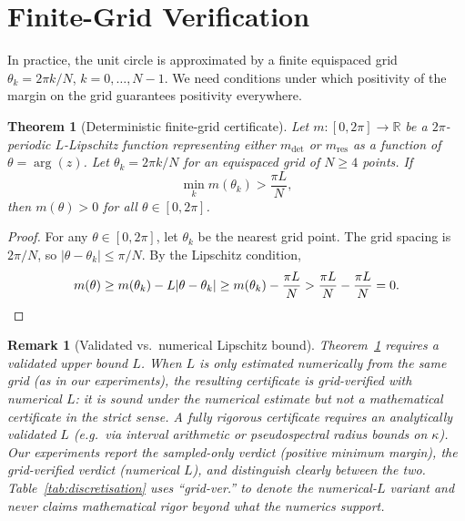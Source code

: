 \documentclass{article}
\newtheorem{theorem}{Theorem}
\newtheorem{remark}{Remark}
\theoremstyle{definition}
\newcommand{\R}{\mathbb{R}}
\begin{document}
\section{Finite-Grid Verification}
\label{sec:grid}

In practice, the unit circle is approximated by a finite equispaced grid
$\theta_k = 2\pi k / N$, $k = 0, \ldots, N-1$.  We need conditions under
which positivity of the margin on the grid guarantees positivity everywhere.

\begin{theorem}[Deterministic finite-grid certificate]
\label{thm:grid}
Let $m : [0, 2\pi] \to \R$ be a $2\pi$-periodic $L$-Lipschitz function
representing either $m_{\det}$ or $m_{\mathrm{res}}$ as a function of
$\theta = \arg(z)$.  Let $\theta_k = 2\pi k/N$ for an equispaced grid of
$N \geq 4$ points.  If
\[
  \min_{k} m(\theta_k) > \frac{\pi L}{N},
\]
then $m(\theta) > 0$ for all $\theta \in [0, 2\pi]$.
\end{theorem}

\begin{proof}
For any $\theta \in [0, 2\pi]$, let $\theta_k$ be the nearest grid point.
The grid spacing is $2\pi/N$, so $|\theta - \theta_k| \leq \pi/N$.  By the
Lipschitz condition,
\[
  m(\theta) \geq m(\theta_k) - L|\theta - \theta_k| \geq m(\theta_k) - \frac{\pi L}{N}
  > \frac{\pi L}{N} - \frac{\pi L}{N} = 0. \qedhere
\]
\end{proof}

\begin{remark}[Validated vs.\ numerical Lipschitz bound]
Theorem~\ref{thm:grid} requires a \emph{validated} upper bound $L$.  When
$L$ is only estimated numerically from the same grid (as in our experiments),
the resulting certificate is \emph{grid-verified with numerical $L$}: it is
sound under the numerical estimate but not a mathematical certificate in the
strict sense.  A fully rigorous certificate requires an analytically validated
$L$ (e.g.\ via interval arithmetic or pseudospectral radius bounds on
$\kappa$).  Our experiments report the sampled-only verdict (positive minimum
margin), the grid-verified verdict (numerical $L$), and distinguish clearly
between the two.  Table~\ref{tab:discretisation} uses ``grid-ver.'' to denote
the numerical-$L$ variant and never claims mathematical rigor beyond what the
numerics support.
\end{remark}
\end{document}
